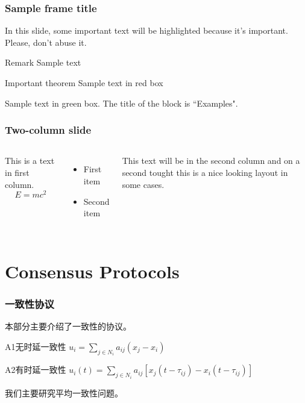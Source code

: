 \documentclass{beamer}
\begin{document}
\begin{frame}
\frametitle{Sample frame title}

In this slide, some important text will be
\alert{highlighted} because it's important.
Please, don't abuse it.

\begin{block}{Remark}
Sample text
\end{block}

\begin{alertblock}{Important theorem}
Sample text in red box
\end{alertblock}

\begin{examples}
Sample text in green box. The title of the block is ``Examples".
\end{examples}
\end{frame}


\begin{frame}
\frametitle{Two-column slide}

\begin{columns}

This is a text in first column.
$$E=mc^2$$
\begin{itemize}
\item First item
\item Second item
\end{itemize}

This text will be in the second column
and on a second tought this is a nice looking
layout in some cases.
\end{columns}
\end{frame}

\section{Consensus Protocols}

\begin{frame}
\frametitle{一致性协议}

本部分主要介绍了一致性的协议。

\begin{block}{A1无时延一致性}
    $u_i = \sum_{j\in N_i}a_{ij}(x_j-x_i)$
\end{block}

\begin{alertblock}{A2有时延一致性}
    $u_i(t) = \sum_{j\in N_i}a_{ij}[x_j(t-\tau_{ij})-x_i(t-\tau_{ij})]$
\end{alertblock}


我们主要研究平均一致性问题。

\end{frame}
\end{document}
